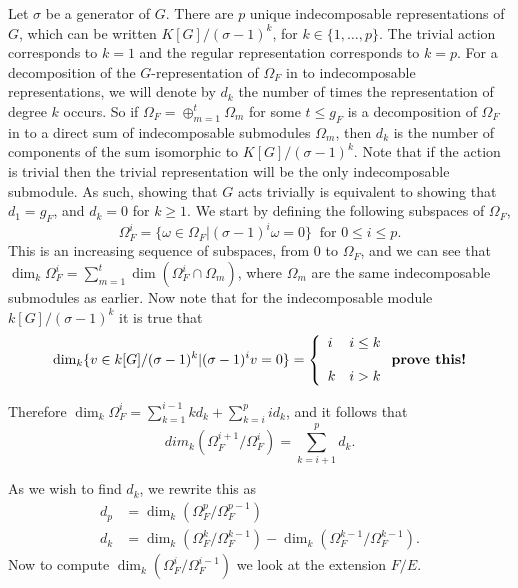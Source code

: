 Let $\sigma$ be a generator of $G$. 
There are $p$ unique indecomposable representations of $G$, which can be written $K[G]/(\sigma - 1)^k$, for $k\in \{1,\ldots, p\}$.
The trivial action corresponds to $k=1$ and the regular representation corresponds to $k=p$.
For a decomposition of the $G$-representation of $\Omega_F$ in to indecomposable representations, we will denote by $d_k$ the number of times the representation of degree $k$ occurs.
So if $\Omega_F = \oplus_{m=1}^t \Omega_m$ for some $t\leq g_F$ is a decomposition of $\Omega_F$ in to a direct sum of indecomposable submodules $\Omega_m$, then $d_k$ is the number of components of the sum isomorphic to $K[G]/(\sigma -1)^k.$
Note that if the action is trivial then the trivial representation will be the only indecomposable submodule. 
As such, showing that $G$ acts trivially is equivalent to showing that $d_1 = g_F$, and $d_k= 0 $ for $k \geq 1$.
We start by defining the following subspaces of $\Omega_F$,
\begin{equation*}
	\Omega_F^i = \{\omega\in \Omega_F | (\sigma - 1)^i\omega=0\}\ \mbox{ for } 0\leq i \leq p.
\end{equation*}
This is an increasing sequence of subspaces, from $0$ to $\Omega_F$, and we can see that $\dim_k\Omega_F^i = \sum_{m=1}^t\dim(\Omega_F^i \cap \Omega_m)$, where $\Omega_m$ are the same indecomposable submodules as earlier.
Now note that for the indecomposable module $k[G]/(\sigma - 1)^k$ it is true that 
\[
 \dim_k\{v \in k[G]/(\sigma - 1)^k | (\sigma - 1)^iv = 0\} = \left\{ \begin{array}{ll}
                                                                      i & i\leq k \\
\\
								      k & i > k
                                                                     \end{array} \right. \mbox{\textbf{prove this!}}
\]

Therefore $\dim_k\Omega_F^i = \sum _{k=1}^{i-1} kd_k + \sum_{k=i}^p id_k$, and it follows that 
\[
dim_k(\Omega_F^{i+1}/\Omega_F^i) = \sum_{k=i+1}^p d_k.
\]

As we wish to find $d_k$, we rewrite this as 
\begin{align*}
d_p & =  \dim_k(\Omega_F^p/\Omega_F^{p-1}) \\
d_k & =  \dim_k(\Omega_F^k/\Omega_F^{k-1}) - \dim_k(\Omega_F^{k-1}/\Omega_F^{k-1}).
\end{align*}
Now to compute $\dim_k(\Omega_F^i/\Omega_F^{i-1})$ we look at the extension $F/E$.


